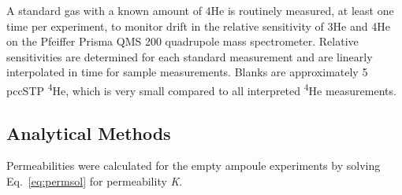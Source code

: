 A standard gas with a known amount of 4He is routinely measured, at least one time per experiment, to monitor drift in the relative sensitivity of 3He and 4He on the Pfeiffer Prisma QMS 200 quadrupole mass spectrometer. Relative sensitivities are determined for each standard measurement and are linearly interpolated in time for sample measurements. Blanks are approximately 5 pccSTP \textsuperscript{4}He, which is very small compared to all interpreted \textsuperscript{4}He measurements.

\subsection{Analytical Methods}\label{analytical-methods}

Permeabilities were calculated for the empty ampoule experiments by solving Eq.~\eqref{eq:permsol} for permeability \emph{K}.

